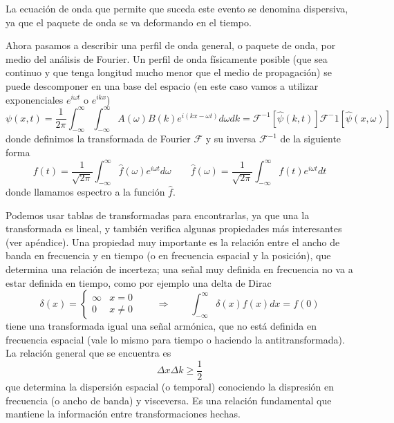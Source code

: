\documentclass[a4paper,spanish]{article}
\numberwithin{equation}{section}
\begin{document}
			La ecuaci\'on de onda que permite que suceda este evento se denomina dispersiva, ya que el paquete de onda se va deformando en el tiempo.
			
			Ahora pasamos a describir una perfil de onda general, o paquete de onda, por medio del an\'alisis de Fourier. Un perfil de onda f\'isicamente posible (que sea continuo y que tenga longitud mucho menor que el medio de propagaci\'on) se puede descomponer en una base del espacio (en este caso vamos a utilizar exponenciales $e^{i \omega t}$ o $e^{i k x}$)
			\begin{equation}
				\psi(x,t) = \frac{1}{2\pi} \int_{-\infty}^{\infty}\int_{-\infty}^{\infty} A(\omega) B(k) e^{i(k x - \omega t)} d\omega dk = \mathcal{F}^{-1}[\hat{\psi}(k,t)] \mathcal{F}^-1[\hat{\psi}(x,\omega)]
				\label{eq:ondas_paquetes_fourier_general}
			\end{equation}
			donde definimos la transformada de Fourier $\mathcal{F}$ y su inversa $\mathcal{F}^{-1}$ de la siguiente forma
			\begin{equation}
				f(t) = \frac{1}{\sqrt{2 \pi}} \int_{-\infty}^{\infty} \hat{f}(\omega) e^{i \omega t} d\omega \qquad \hat{f}(\omega) = \frac{1}{\sqrt{2 \pi}} \int_{-\infty}^{\infty} f(t) e^{i \omega t} dt
				\label{eq:ondas_paquetes_fourier_def}
			\end{equation}
			donde llamamos espectro a la funci\'on $\hat{f}$. 
			
			Podemos usar tablas de transformadas para encontrarlas, ya que una la transformada es lineal, y tambi\'en verifica algunas propiedades m\'as interesantes (ver ap\'endice). Una propiedad muy importante es la relaci\'on entre el ancho de banda en frecuencia y en tiempo (o en frecuencia espacial y la posici\'on), que determina una relaci\'on de incerteza; una se\~nal muy definida en frecuencia no va a estar definida en tiempo, como por ejemplo una delta de Dirac 
			\[\delta(x) = \begin{cases} \infty & x = 0 \\ 0 & x \neq 0 \end{cases} \qquad \Rightarrow \qquad \displaystyle \int_{-\infty}^{\infty} \delta(x) f(x) dx = f(0)\]
			tiene una transformada igual una se\~nal arm\'onica, que no est\'a definida en frecuencia espacial (vale lo mismo para tiempo o haciendo la antitransformada). La relaci\'on general que se encuentra es
			\begin{equation}
				\Delta x \Delta k \geq \frac{1}{2}
				\label{eq:ondas_paquetes_incerteza}
			\end{equation}
			que determina la dispersi\'on espacial (o temporal) conociendo la dispresi\'on en frecuencia (o ancho de banda) y visceversa. Es una relaci\'on fundamental que mantiene la informaci\'on entre transformaciones hechas.
\end{document}
